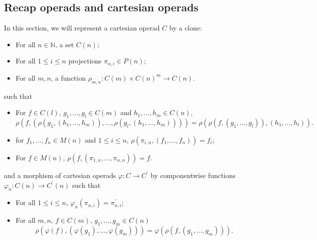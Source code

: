 \documentclass{amsbook}
\begin{document}
  \subsection{Recap operads and cartesian operads}
  In this section, we will represent a cartesian operad $ C $ by a clone:
  \begin{itemize}
    \item For all $ n \in \mathbb N $, a set $ C(n) $;
    \item For all $ 1 \leq i \leq n $ projections $ \pi_{n, i} \in P(n) $;
    \item For all $ m, n $, a function $ \rho_{m, n}: C(m) \times C(n)^m \to C(n) $.
  \end{itemize}
  such that
  \begin{itemize}
    \item For $ f \in C(l) $, $ g_1, \dots, g_l \in C(m) $ and $ h_1, \dots, h_m \in C(n) $,
      \[ \rho(f, (\rho(g_1, (h_1, \dots, h_m)), \dots, \rho(g_l, (h_1, \dots, h_m)))) = \rho(\rho(f, (g_1, \dots, g_l)), (h_1, \dots, h_l)). \]
    \item for $ f_1, \dots, f_n \in M(n) $ and $ 1 \leq i \leq n $, $ \rho(\pi_{i, n}, (f_1, \dots, f_n)) = f_i $;
    \item For $ f \in M(n) $, $ \rho(f, (\pi_{1, n}, \dots, \pi_{n, n})) = f $.
  \end{itemize}
  and a morphism of cartesian operads $ \varphi: C \to C^\prime $ by componentwise functions $ \varphi_n: C(n) \to C^\prime(n) $ such that
  \begin{itemize}
    \item For all $ 1 \leq i \leq n $, $ \varphi_n(\pi_{n, i}) = \pi^\prime_{n, i} $;
    \item For all $ m, n $, $ f \in C(m) $, $ g_1, \dots, g_m \in C(n) $
      \[ \rho(\varphi(f), (\varphi(g_1), \dots, \varphi(g_m))) = \varphi(\rho(f, (g_1, \dots, g_m))). \]
  \end{itemize}
\end{document}
